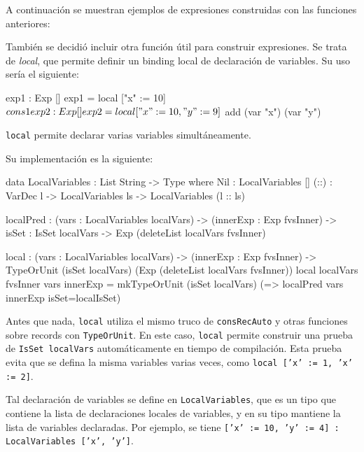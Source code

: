 A continuación se muestran ejemplos de expresiones construidas con las funciones anteriores:


También se decidió incluir otra función útil para construir expresiones. Se trata de \textit{local}, que permite definir un binding local de declaración de variables. Su uso sería el siguiente:

\begin{code}
exp1 : Exp []
exp1 = local ["x" := 10] $ cons 1

exp2 : Exp []
exp2 = local ["x" := 10, "y" := 9] $ add (var "x") (var "y")
\end{code}

\texttt{local} permite declarar varias variables simultáneamente.

Su implementación es la siguiente:

\begin{code}
data LocalVariables : List String -> Type where
  Nil : LocalVariables []
  (::) : VarDec l -> LocalVariables ls -> 
    LocalVariables (l :: ls) 

localPred : (vars : LocalVariables localVars) -> 
  (innerExp : Exp fvsInner) -> {isSet : IsSet localVars} -> 
  Exp (deleteList localVars fvsInner)

local : (vars : LocalVariables localVars) -> (innerExp : Exp fvsInner) ->
  TypeOrUnit (isSet localVars) (Exp (deleteList localVars fvsInner))
local {localVars} {fvsInner} vars innerExp = 
  mkTypeOrUnit (isSet localVars)
    (\localIsSet => localPred vars innerExp {isSet=localIsSet})
\end{code}

Antes que nada, \texttt{local} utiliza el mismo truco de \texttt{consRecAuto} y otras funciones sobre records con \texttt{TypeOrUnit}. En este caso, \texttt{local} permite construir una prueba de \texttt{IsSet localVars} automáticamente en tiempo de compilación. Esta prueba evita que se defina la misma variables varias veces, como \texttt{local ['x' := 1, 'x' := 2]}.

Tal declaración de variables se define en \texttt{LocalVariables}, que es un tipo que contiene la lista de declaraciones locales de variables, y en su tipo mantiene la lista de variables declaradas. Por ejemplo, se tiene \texttt{['x' := 10, 'y' := 4] : LocalVariables ['x', 'y']}.


